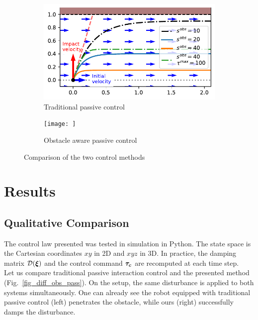 \documentclass[conference]{IEEEtran}
\begin{document}
\begin{figure}
\centering
\begin{subfigure}{0.99\columnwidth}
  \centerline{\includegraphics[width=\textwidth]{figures/parallel_avoidance_obstacle}}
  \caption{Traditional passive control}
\end{subfigure}
\begin{subfigure}{0.5\columnwidth}
  \centerline{\texttt{[image: ]}}
  \caption{Obstacle aware passive control}
\end{subfigure}
\caption{Comparison of the two control methods}
\label{fig:collision_avoidance}
\end{figure}



\section{Results} 
\subsection{Qualitative Comparison} \label{sec:qual_comp}
The control law presented was tested in simulation in Python. The state space is the Cartesian coordinates $xy$ in 2D and $xyz$ in 3D. In practice, the damping matrix $\mathcal{D}(\boldsymbol{\xi})$ and the control command $\boldsymbol{\tau_c}$ are recomputed at each time step.\\

Let us compare traditional passive interaction control and the presented method (Fig.~\ref{fig_diff_obs_pass}). On the setup, the same disturbance is applied to both systems simultaneously. One can already see the robot equipped with traditional passive control (left) penetrates the obstacle, while ours (right) successfully damps the disturbance.
\end{document}
